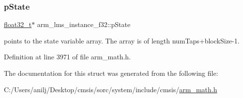 \subsubsection{\texorpdfstring{p\+State}{pState}}
{\footnotesize\ttfamily \hyperlink{arm__math_8h_a4611b605e45ab401f02cab15c5e38715}{float32\+\_\+t}$\ast$ arm\+\_\+lms\+\_\+instance\+\_\+f32\+::p\+State}

points to the state variable array. The array is of length num\+Taps+block\+Size-\/1. 

Definition at line 3971 of file arm\+\_\+math.\+h.



The documentation for this struct was generated from the following file\+:\begin{DoxyCompactItemize}
\item 
C\+:/\+Users/anilj/\+Desktop/cmsis/sorc/system/include/cmsis/\hyperlink{arm__math_8h}{arm\+\_\+math.\+h}\end{DoxyCompactItemize}
